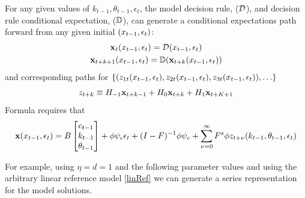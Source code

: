 \documentclass[12pt]{article}
\begin{document}
For any given values of $k_{t-1},\theta_{t-1}, \epsilon_t$, the model decision rule, ($\mathcal{D}$), and decision rule conditional expectation, ($\mathbb{D}$), can generate a conditional expectations path forward from  any given initial $(x_{t-1},\epsilon_t)$:
\begin{gather*}
  \mathbf{x}_t({x_{t-1},\epsilon_t})=\mathcal{D}({x_{t-1},\epsilon_t})\\
  \mathbf{x}_{t+k+1}({x_{t-1},\epsilon_t})=\mathbb{D}(\mathbf{x}_{t+k}({x_{t-1},\epsilon_t}))
\end{gather*}
and corresponding paths for $\{(z_{1t}(x_{t-1},\epsilon_t), z_{2t}(x_{t-1},\epsilon_t), z_{3t}(x_{t-1},\epsilon_t)),\ldots\}$
\begin{gather*}
  z_{t+k} \equiv H_{-1} \mathbf{x}_{t+k-1} +  H_0 \mathbf{x}_{t+k} +  H_1 \mathbf{x}_{t+K+1} 
\end{gather*}
Formula  requires that
\begin{gather*}
\mathbf{x}({x_{t-1},\epsilon_t})=
B   \begin{bmatrix}
c_{t-1}\\
k_{t-1}\\
\theta_{t-1}
  \end{bmatrix}  + \phi \psi_\epsilon\epsilon_t + (I - F)^{-1} \phi \psi_c + \sum_{{\nu}=0}^\infty F^s \phi z_{t+{\nu}}(k_{t-1},\theta_{t-1}, \epsilon_t) 
\end{gather*}

For example, using $\eta=d=1$ and the following parameter values and using the arbitrary linear reference model \eqref{linRef} we can generate a series representation for the model solutions.
\end{document}
